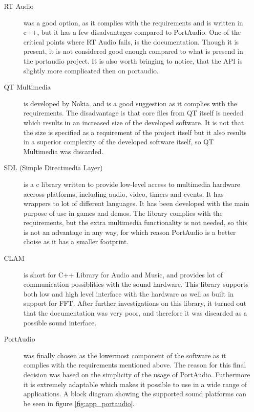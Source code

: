 \begin{description}
\item[RT Audio\footnotemark] was a good option, as it complies with the requirements and is written in c++, but it has a few disadvantages compared to PortAudio. One of the critical points where RT Audio fails, is the documentation. Though it is present, it is not considered good enough compared to what is presend in the portaudio project. It is also worth bringing to notice, that the API is slightly more complicated then on portaudio.

\item[QT Multimedia\footnotemark] is developed by Nokia, and is a good suggestion as it complies with the requirements. The disadvantage is that core files from QT itself is needed which results in an increased size of the developed software. It is not that the size is specified as a requirement of the project itself but it also results in a superior complexity of the developed software itself, so QT Multimedia was discarded.

\item[SDL (Simple Directmedia Layer)\footnotemark]
 is a c library written to provide low-level access to multimedia hardware accross platforms, including audio, video, timers and events. It has wrappers to lot of different languages. It has been developed with the main purpose of use in games and demos. The library complies with the requirements, but the extra multimedia functionality is not needed, so this is not an advantage in any way, for which reason PortAudio is a better choise as it has a smaller footprint.

\item[CLAM\footnotemark] is short for C++ Library for Audio and Music, and provides lot of communication possiblities with the sound hardware. This library supports both low and high level interface with the hardware as well as built in support for FFT. After further investigations on this library, it turned out that the documentation was very poor, and therefore it was discarded as a possible sound interface.

\item[PortAudio\footnotemark] was finally chosen as the lowermost component of the software as it complies with the requirements mentioned above.  The reason for this final decision was based on the simplicity of the usage of PortAudio. Futhermore it is extremely adaptable which makes it possible to use in a wide range of applications. A block diagram showing the supported sound platforms can be seen in figure \ref{fig:app_portaudio}.
\end{description}

